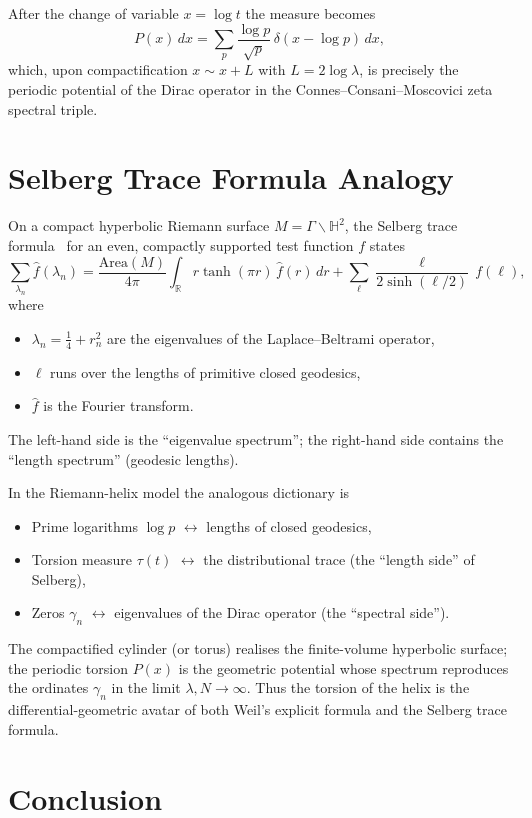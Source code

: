 \documentclass[11pt,a4paper]{article}
\begin{document}
After the change of variable \(x=\log t\) the measure becomes
\[
P(x)\,dx=\sum_{p}\frac{\log p}{\sqrt{p}}\,\delta(x-\log p)\,dx,
\]
which, upon compactification \(x\sim x+L\) with \(L=2\log\lambda\), is precisely the periodic potential of the Dirac operator in the Connes--Consani--Moscovici zeta spectral triple.

\section{Selberg Trace Formula Analogy}

On a compact hyperbolic Riemann surface \(M=\Gamma\backslash\mathbb{H}^2\), the Selberg trace formula~\cite{Selberg1956} for an even, compactly supported test function \(f\) states
\[
\sum_{\lambda_n}\hat f(\lambda_n)=\frac{\mathrm{Area}(M)}{4\pi}\int_{\mathbb{R}} r\tanh(\pi r)\,\hat f(r)\,dr
+\sum_{\ell}\frac{\ell}{2\sinh(\ell/2)}\,f(\ell),
\]
where
\begin{itemize}
\item \(\lambda_n=\frac14+r_n^2\) are the eigenvalues of the Laplace--Beltrami operator,
\item \(\ell\) runs over the lengths of primitive closed geodesics,
\item \(\hat f\) is the Fourier transform.
\end{itemize}
The left-hand side is the ``eigenvalue spectrum''; the right-hand side contains the ``length spectrum'' (geodesic lengths).

In the Riemann-helix model the analogous dictionary is
\begin{itemize}
\item Prime logarithms \(\log p\) \(\leftrightarrow\) lengths of closed geodesics,
\item Torsion measure \(\tau(t)\) \(\leftrightarrow\) the distributional trace (the ``length side'' of Selberg),
\item Zeros \(\gamma_n\) \(\leftrightarrow\) eigenvalues of the Dirac operator (the ``spectral side'').
\end{itemize}
The compactified cylinder (or torus) realises the finite-volume hyperbolic surface; the periodic torsion \(P(x)\) is the geometric potential whose spectrum reproduces the ordinates \(\gamma_n\) in the limit \(\lambda,N\to\infty\). Thus the torsion of the helix is the differential-geometric avatar of both Weil's explicit formula and the Selberg trace formula.

\section{Conclusion}
\end{document}
